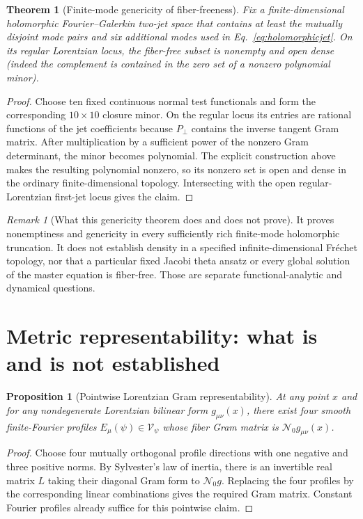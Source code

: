 \documentclass[11pt,a4paper]{article}
\newtheorem{theorem}[definition]{Theorem}
\newtheorem{proposition}[definition]{Proposition}
\theoremstyle{remark}
\newtheorem{remark}[definition]{Remark}
\newcommand{\Nzero}{\mathcal N_0}
\begin{document}
\begin{theorem}[Finite-mode genericity of fiber-freeness]
Fix a finite-dimensional holomorphic Fourier--Galerkin two-jet space that
contains at least the mutually disjoint mode pairs and six additional modes used
in Eq.~\eqref{eq:holomorphicjet}.  On its regular Lorentzian locus, the
fiber-free subset is nonempty and open dense (indeed the complement is contained
in the zero set of a nonzero polynomial minor).
\end{theorem}

\begin{proof}
Choose ten fixed continuous normal test functionals and form the corresponding
$10\times10$ closure minor.  On the regular locus its entries are rational
functions of the jet coefficients because $P_\perp$ contains the inverse
tangent Gram matrix.  After multiplication by a sufficient power of the
nonzero Gram determinant, the minor becomes polynomial.  The explicit
construction above makes the resulting polynomial nonzero, so its nonzero set
is open and dense in the ordinary finite-dimensional topology.  Intersecting
with the open regular-Lorentzian first-jet locus gives the claim.
\end{proof}

\begin{remark}[What this genericity theorem does and does not prove]
It proves nonemptiness and genericity in every sufficiently rich finite-mode
holomorphic truncation.  It does not establish density in a specified
infinite-dimensional Fr\'echet topology, nor that a particular fixed Jacobi
theta ansatz or every global solution of the master equation is fiber-free.
Those are separate functional-analytic and dynamical questions.
\end{remark}

\section{Metric representability: what is and is not established}

\begin{proposition}[Pointwise Lorentzian Gram representability]
At any point $x$ and for any nondegenerate Lorentzian bilinear form
$g_{\mu\nu}(x)$, there exist four smooth finite-Fourier profiles
$E_\mu(\psi)\in\mathscr V_\psi$ whose fiber Gram matrix is
$\Nzero g_{\mu\nu}(x)$.
\end{proposition}

\begin{proof}
Choose four mutually orthogonal profile directions with one negative and three
positive norms.  By Sylvester's law of inertia, there is an invertible real
matrix $L$ taking their diagonal Gram form to $\Nzero g$.  Replacing the four
profiles by the corresponding linear combinations gives the required Gram
matrix.  Constant Fourier profiles already suffice for this pointwise claim.
\end{proof}
\end{document}
